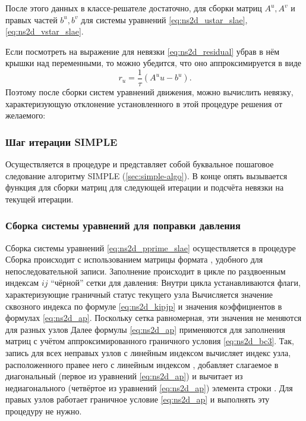 После этого данных в классе-решателе достаточно,
для сборки матриц $A^u, A^v$ и правых частей
$b^u, b^v$ для системы уравнений \eqref{eq:ns2d_ustar_slae}, \eqref{eq:ns2d_vstar_slae}.

Если посмотреть на выражение для невязки \eqref{eq:ns2d_residual} убрав в нём крышки над переменными, то можно
убедится, что оно аппроксимируется в виде
\begin{equation*}
    r_u = \frac{1}{\tau}\left(A^u u - b^u\right).
\end{equation*}
Поэтому после сборки систем уравнений движения, можно вычислить невязку, характеризующую
отклонение установленного в этой процедуре решения от желаемого:

\subsubsection{Шаг итерации SIMPLE}
Осуществляется в процедуре
и представляет собой буквальное пошаговое следование алгоритму SIMPLE (\ref{sec:simple-algo}).
В конце опять вызывается функция  для сборки матриц для следующей итерации
и подсчёта невязки на текущей итерации.

\subsubsection{Сборка системы уравнений для поправки давления}

Сборка системы уравнений \eqref{eq:ns2d_pprime_slae}
осуществляется в процедуре
Сборка происходит с использованием матрицы формата ,
удобного для непоследовательной записи.
Заполнение происходит в цикле по раздвоенным индексам $ij$
``чёрной'' сетки для давления:
Внутри цикла устанавливаются флаги, характеризующие граничный статус текущего узла
Вычисляется значение сквозного индекса по формуле \eqref{eq:ns2d_kipjp}
и значения коэффициентов в формулах \eqref{eq:ns2d_ap}. Поскольку
сетка равномерная, эти значения не меняются для разных узлов
Далее формулы \eqref{eq:ns2d_ap}
применяются для заполнения матриц
с учётом аппроксимированного граничного условия \eqref{eq:ns2d_bc3}.
Так, запись
для всех неправых узлов с линейным индексом  вычисляет индекс 
узла, расположенного правее него с линейным индексом ,
добавляет слагаемое в диагональный (первое из уравнений \eqref{eq:ns2d_ap}) и
вычитает из недиагонального (четвёртое из уравнений \eqref{eq:ns2d_ap}) элемента
строки .
Для правых узлов работает граничное условие \eqref{eq:ns2d_ap} и выполнять эту процедуру
не нужно.

